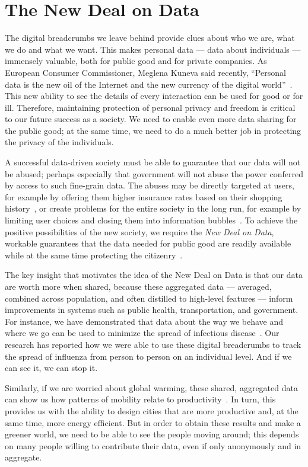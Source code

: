 \section{The New Deal on Data }

The digital breadcrumbs we leave behind provide clues about who we are, what we do and what we want.
This makes personal data --- data about individuals --- immensely valuable, both for public good and for private companies.
As European Consumer Commissioner, Meglena Kuneva said recently, ``Personal data is the new oil of the Internet and the new currency of the digital world''~\cite{kuneva2009}.
This new ability to see the details of every interaction can be used for good or for ill.
Therefore, maintaining protection of personal privacy and freedom is critical to our future success as a society.
We need to enable even more data sharing for the public good; at the same time, we need to do a much better job in protecting the privacy of the individuals.

A successful data-driven society must be able to guarantee that our data will not be abused; perhaps especially that government will not abuse the power conferred by access to such fine-grain data.
The abuses may be directly targeted at users, for example by offering them higher insurance rates based on their shopping history~\cite{gittleson2013big}, or create problems for the entire society in the long run, for example by limiting user choices and closing them into information bubbles~\cite{hannak2013measuring}. 
To achieve the positive possibilities of the new society, we require the \emph{New Deal on Data}, workable guarantees that the data needed for public good are readily available while at the same time protecting the citizenry~\cite{pentland2009reality}.

The key insight that motivates the idea of the New Deal on Data is that our data are worth more when shared, because these aggregated data --- averaged, combined across population, and often distilled to high-level features --- inform improvements in systems such as public health, transportation, and government.
For instance, we have demonstrated that data about the way we behave and where we go can be used to minimize the spread of infectious disease~\cite{madan2010social, pentland2009using}.
Our research has reported how we were able to use these digital breadcrumbs to track the spread of influenza from person to person on an individual level.
And if we can see it, we can stop it.

Similarly, if we are worried about global warming, these shared, aggregated data can show us how patterns of mobility relate to productivity~\cite{pan2013urban}.
In turn, this provides us with the ability to design cities that are more productive and, at the same time, more energy efficient.
But in order to obtain these results and make a greener world, we need to be able to see the people moving around; this depends on many people willing to contribute their data, even if only anonymously and in aggregate.

